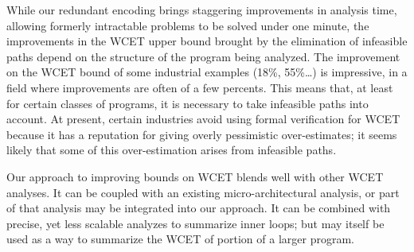 \documentclass[a4paper,twocolumn,11pt]{article}
\begin{document}
While our redundant encoding brings staggering improvements in analysis time, allowing formerly intractable problems to be solved under one minute, the improvements in the WCET upper bound brought by the elimination of infeasible paths depend on the structure of the program being analyzed.
The improvement on the WCET bound of some industrial examples (18\%, 55\%\dots) is impressive, in a field where improvements are often of a few percents.
This means that, at least for certain classes of programs, it is necessary to take infeasible paths into account.
At present, certain industries avoid using formal verification for WCET because it has a reputation for giving overly pessimistic over-estimates; it seems likely that some of this over-estimation arises from infeasible paths.

Our approach to improving bounds on WCET blends well with other WCET analyses. It can be coupled with an existing micro-architectural analysis, or part of that analysis may be integrated into our approach. It can be combined with precise, yet less scalable analyzes \parencite{DBLP:conf/rtns/KnoopKZ13,Holsti_WCET2008} to summarize inner loops; but may itself be used as a way to summarize the WCET of portion of a larger program.

\printbibliography
\end{document}
